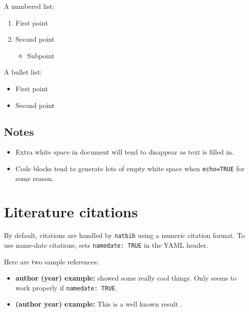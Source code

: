\documentclass[webpdf,large,modern,namedate]{oup-authoring-template}
\providecommand{\tightlist}{%
  \setlength{\itemsep}{0pt}\setlength{\parskip}{0pt}}
\theoremstyle{thmstyleone}
\theoremstyle{thmstyletwo}
\theoremstyle{thmstylethree}
\begin{document}
A numbered list:

\begin{enumerate}
\def\labelenumi{\arabic{enumi})}
\tightlist
\item
  First point
\item
  Second point

  \begin{itemize}
  \tightlist
  \item
    Subpoint
  \end{itemize}
\end{enumerate}

A bullet list:

\begin{itemize}
\tightlist
\item
  First point
\item
  Second point
\end{itemize}

\hypertarget{notes}{%
\subsection{Notes}\label{notes}}

\begin{itemize}
\tightlist
\item
  Extra white space in document will tend to disappear as text is filled
  in.
\item
  Code blocks tend to generate lots of empty white space when
  \texttt{echo=TRUE} for some reason.
\end{itemize}

\hypertarget{literature-citations}{%
\section{Literature citations}\label{literature-citations}}

By default, citations are handled by \texttt{natbib} using a numeric
citation format. To use name-date citations, sets
\texttt{namedate:\ TRUE} in the YAML header.

Here are two sample references:

\begin{itemize}
\tightlist
\item
  \textbf{author (year) example:} \citet{horvath2018dna} showed some
  really cool things. Only seems to work properly if
  \texttt{namedate:\ TRUE}.
\item
  \textbf{(author year) example:} This is a well known result
  \citep{ji20123d}.
\end{itemize}
\end{document}
